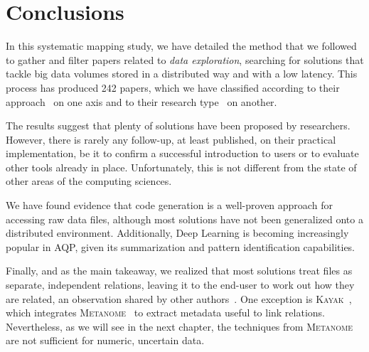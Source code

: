 \section{Conclusions}
\label{sec:conclusions}
In this systematic mapping study, we have detailed the method that we followed
to gather and filter papers related to \emph{data exploration}, searching
for solutions that tackle big data volumes stored in a distributed way and with
a low latency. This process has produced 242 papers, which we have classified
according to their approach~\cite{Idreos2015} on one axis and to their research
type~\cite{Wieringa2006} on another.

The results suggest that  plenty of solutions have been proposed by researchers.
However, there is rarely any follow-up, at least published, on their
practical implementation, be it to confirm a successful introduction to users
or to evaluate other tools already in place.
Unfortunately, this is not different from the state of other areas of the computing sciences.

We have found evidence that code generation is a well-proven approach for
accessing raw data files, although most solutions have not been generalized
onto a distributed environment. Additionally, Deep Learning is becoming increasingly
popular in \gls{AQP}, given its summarization and pattern identification capabilities.

Finally, and as the main takeaway, we realized that most solutions treat files as separate,
independent relations, leaving it to the end-user to work out how they are related,
an observation shared by other authors~\cite{Silva2016}. One exception is
\textsc{Kayak}~\cite{10.14778/3137765.3137792}, which integrates \textsc{Metanome}~\cite{papenbrock2015data}
to extract metadata useful to link relations. Nevertheless, as we will see in the next chapter,
the techniques from \textsc{Metanome} are not sufficient for numeric, uncertain data.